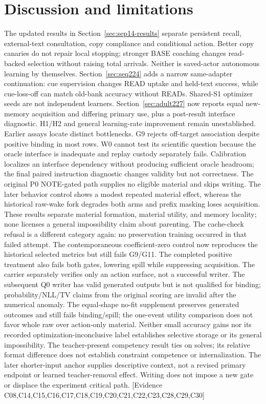 \documentclass[11pt]{article}
\newcommand{\ev}[1]{\textsf{[Evidence #1]}}
\begin{document}
\section{Discussion and limitations}
The updated results in Section~\ref{sec:sep14-results} separate persistent
recall, external-text consultation, copy compliance and conditional action.
Better copy canaries do not repair local stopping; stronger BASE coaching
changes read-backed selection without raising total arrivals. Neither is
saved-actor autonomous learning by themselves. Section~\ref{sec:seq224}
adds a narrow same-adapter continuation: cue supervision changes READ uptake
and held-text success, while cue-loss-off can match old-bank accuracy without
READs. Shared-S1 optimizer seeds are not independent learners. Section~\ref{sec:adult227}
now reports equal new-memory acquisition and differing primary use, plus a
post-result interface diagnostic. H1/H2 and general learning-rate improvement
remain unestablished. Earlier assays locate distinct bottlenecks. G9 rejects off-target association despite
positive binding in most rows. W0 cannot test its scientific question because
the oracle interface is inadequate and replay custody separately fails.
Calibration localizes an interface dependency without producing sufficient
oracle headroom; the final paired instruction diagnostic changes validity but
not correctness. The original P0 NOTE-gated path supplies no eligible material
and skips writing. The later behavior control shows a modest repeated
material effect, whereas the historical raw-wake fork degrades both arms and
prefix masking loses acquisition. These results separate material formation,
material utility, and memory locality; none licenses a general impossibility
claim about parenting. The cache-check refusal is a different category again:
no preservation training occurred in that failed attempt. The contemporaneous
coefficient-zero control now reproduces the historical selected metrics but
still fails G9/G11. The completed positive treatment also fails both gates,
lowering spill while suppressing acquisition. The carrier separately verifies
only an action surface, not a successful writer. The subsequent Q0 writer has
valid generated outputs but is not qualified for binding; probability/NLL/TV
claims from the original scoring are invalid after the numerical anomaly.
The equal-shape no-fit supplement preserves generated outcomes and still fails
binding/spill; the one-event utility comparison does not favor whole raw over
action-only material. Neither small
accuracy gains nor its recorded optimization-inconclusive label establishes
selective storage or its general impossibility. The teacher-present competency result
ties on solves; its relative format difference does not establish constraint
competence or internalization. The later shorter-input anchor supplies descriptive
context, not a revised primary endpoint or learned teacher-removal effect.
Writing does not impose a new gate or displace the experiment critical path.
\ev{C08,C14,C15,C16,C17,C18,C19,C20,C21,C22,C23,C28,C29,C30}
\end{document}
